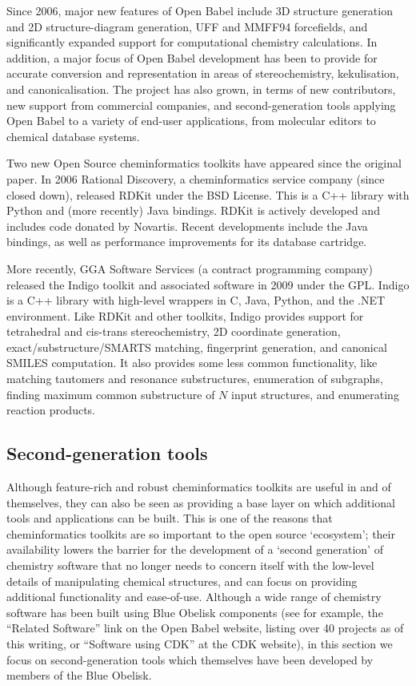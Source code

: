 \documentclass[10pt]{bmc_article}
\newenvironment{bmcformat}{\begin{raggedright}\baselineskip20pt\sloppy\setboolean{publ}{false}}{\end{raggedright}\baselineskip20pt\sloppy}
\begin{document}
\begin{bmcformat}
Since 2006, major new features of Open Babel include 3D structure
generation and 2D structure-diagram generation, UFF and MMFF94
forcefields, and significantly expanded support for computational
chemistry calculations. In addition, a major focus of Open Babel development
has been to provide for accurate conversion and representation in
areas of stereochemistry, kekulisation, and canonicalisation. The
project has also grown, in terms of new contributors, new support from
commercial companies, and second-generation tools applying Open Babel
to a variety of end-user applications, from molecular editors to
chemical database systems.

Two new Open Source cheminformatics toolkits have appeared since the
original paper. In 2006 Rational Discovery, a cheminformatics service
company (since closed down), released RDKit \cite{WebRDKit} under the
BSD License. This is a C++ library with Python and (more recently)
Java bindings. RDKit is actively developed and includes
code donated by Novartis. Recent developments include the Java
bindings, as well as performance improvements for its database
cartridge.

More recently, GGA Software Services
(a contract programming company)
released the Indigo toolkit \cite{WebIndigo} and associated software
in 2009 under the GPL. Indigo is a C++ library with
high-level wrappers in C, Java, Python, and the .NET
environment. Like RDKit and other toolkits, Indigo provides support for
tetrahedral and cis-trans stereochemistry, 2D coordinate generation,
exact/substructure/SMARTS matching, fingerprint generation, and
canonical SMILES computation.
It also provides some less common functionality, like matching
tautomers and resonance substructures, enumeration of subgraphs,
finding maximum common substructure of $N$ input structures, and
enumerating reaction products.

\subsection*{Second-generation tools}

Although feature-rich and robust cheminformatics toolkits are useful
in and of themselves, they can also be seen as providing a base layer
on which additional tools and applications can be built. This is one
of the reasons that cheminformatics toolkits are so important to the
open source `ecosystem'; their availability lowers the barrier for the
development of a `second generation' of chemistry software that no
longer needs to concern itself with the low-level details of
manipulating chemical structures, and can focus on providing
additional functionality and ease-of-use. Although a wide range of
chemistry software has been built using Blue Obelisk
components (see for example, the ``Related Software'' link on the Open
Babel website,\cite{WebOBRelated} listing over 40 projects as of this writing, 
or ``Software using CDK'' at the CDK website), in this
section we focus on second-generation tools which themselves have been
developed by members of the Blue Obelisk. 


\end{bmcformat}
\end{document}

